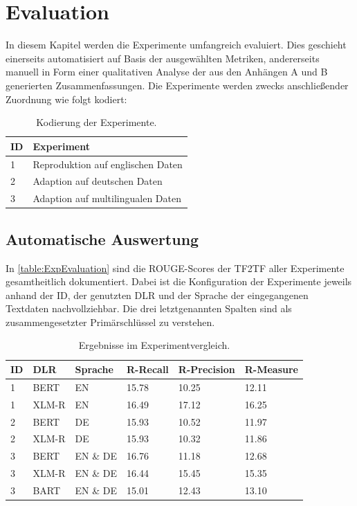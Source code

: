 \chapter{Evaluation}
\thispagestyle{fancy}
\label{chap:Evaluation}

\noindent
In diesem Kapitel werden die Experimente umfangreich evaluiert. Dies geschieht einerseits automatisiert auf Basis der ausgewählten Metriken, andererseits manuell in Form einer qualitativen Analyse der aus den Anhängen A und B generierten Zusammenfassungen. Die Experimente werden zwecks anschließender Zuordnung wie folgt kodiert:

\begin{table}[htb]
\centering
\begin{tabular}{ | p{1cm} | p{7.5cm} | }
\hline
\textbf{ID} & \textbf{Experiment} \\
\hline
1 & Reproduktion auf englischen Daten \\
\hline
2 & Adaption auf deutschen Daten \\
\hline
3 & Adaption auf multilingualen Daten \\
\hline
\end{tabular}
\caption{Kodierung der Experimente.}
\label{table:ExpCoding}
\end{table}


\section{Automatische Auswertung}
\noindent
In \autoref{table:ExpEvaluation} sind die \ac{ROUGE}-Scores der \ac{TF2TF} aller Experimente gesamtheitlich dokumentiert. Dabei ist die Konfiguration der Experimente jeweils anhand der ID, der genutzten \ac{DLR} und der Sprache der eingegangenen Textdaten nachvollziehbar. Die drei letztgenannten Spalten sind als zusammengesetzter Primärschlüssel zu verstehen.

\begin{table}[htb]
\centering
\begin{tabular}{ | p{1cm} | p{2.5cm} | p{2.5cm} | p{2.5cm} | p{2.5cm} | p{2.5cm} | }
\hline
\textbf{ID} & \textbf{DLR} & \textbf{Sprache} & \textbf{R-Recall} & \textbf{R-Precision} & \textbf{R-Measure} \\
\hline
1 & BERT & EN & 15.78 & 10.25 & 12.11 \\
\hline
1 & XLM-R & EN & 16.49 & 17.12 & 16.25 \\
\hline
2 & BERT & DE & 15.93 & 10.52 & 11.97 \\
\hline
2 & XLM-R & DE & 15.93 & 10.32 & 11.86 \\
\hline
3 & BERT & EN \& DE & 16.76 & 11.18 & 12.68 \\
\hline
3 & XLM-R & EN \& DE & 16.44 & 15.45 & 15.35 \\
\hline
3 & BART & EN \& DE & 15.01 & 12.43 & 13.10 \\
\hline
\end{tabular}
\caption{Ergebnisse im Experimentvergleich.}
\label{table:ExpEvaluation}
\end{table}

